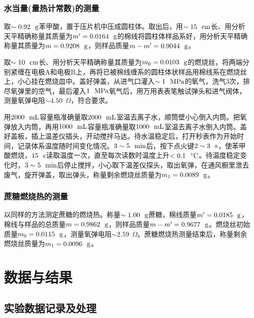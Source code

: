 \documentclass[12pt]{article}
\begin{document}
			\subsubsection{水当量(量热计常数)的测量}
		取$\sim 0.92\ \ {\rm g}$苯甲酸，置于压片机中压成圆柱体。取出后，用$\sim 15\ \ {\rm cm}$长、用分析天平精确称量其质量为$m^{\prime}=0.0164\ \ {\rm g}$的棉线将圆柱体样品系好，用分析天平精确称量其质量为$m=0.9208\ \ {\rm g}$，则样品质量$m-m^{\prime}=0.9044\ \ {\rm g}$。\par 
		取$\sim 10\ \ {\rm cm}$长、用分析天平精确称量其质量为$m_{0}=0.0103\ \ {\rm g}$的燃烧丝，将两端分别紧缠在电极A和电极B上，再将已被棉线缠系的圆柱体状样品用棉线系在燃烧丝上，小心挂在燃烧皿中。盖好弹盖，从进气口灌入$\sim 1\ \ {\rm MPa}$的氧气，洗气3次，排尽氧弹里的空气，最后灌入$1\ \ {\rm MPa}$氧气后，用万用表表笔触试弹头和进气阀体，测量氧弹电阻$\sim 4.50\ \ \Omega$，符合要求。\par 
		用$2000\ \ {\rm mL}$容量瓶准确量取$2000\ \ {\rm mL}$室温去离子水，顺筒壁小心倒入内筒。把氧弹放入内筒，再用$1000\ \ {\rm mL}$容量瓶准确量取$1000\ \ {\rm mL}$室温去离子水倒入内筒。盖好盖板，插上温差仪插头，开动搅拌马达。待水温稳定后，打开秒表作为开始时间，记录体系温度随时间变化情况。$3\sim 5\ \ {\rm min}$后，按下点火键$2\sim 3\ \ {\rm s}$，使苯甲酸燃烧，$15\ \ {\rm s}$读取温度一次，直至每次读数时温度上升$<0.1\ \ {\rm ^{\circ}C}$。待温度稳定变化时，$3\sim 5\ \ {\rm min}$后停止搅拌，小心取下温差仪探头，取出氧弹，在通风橱里泄去废气，旋开弹盖，取出弹头，称量剩余燃烧丝质量为$m_{1}=0.0089\ \ {\rm g}$。
		
		
\subsubsection{蔗糖燃烧热的测量}
	以同样的方法测定蔗糖的燃烧热。称量$\sim 1.00\ \ {\rm g}$蔗糖，棉线质量$m^{\prime}=0.0185\ \ {\rm g}$，棉线与样品的总质量$m=0.9862\ \ {\rm g}$，则样品质量$m-m^{\prime}=0.9677\ \ {\rm g}$。燃烧丝初始质量$m_{0}=0.0115\ \ {\rm g}$，测量氧弹电阻$\sim 2.59\ \ \Omega$。蔗糖燃烧热测量结束后，称量剩余燃烧丝质量为$m_{1}=0.0096\ \ {\rm g}$。


 \section{数据与结果}
 \subsection{实验数据记录及处理}
\end{document}
